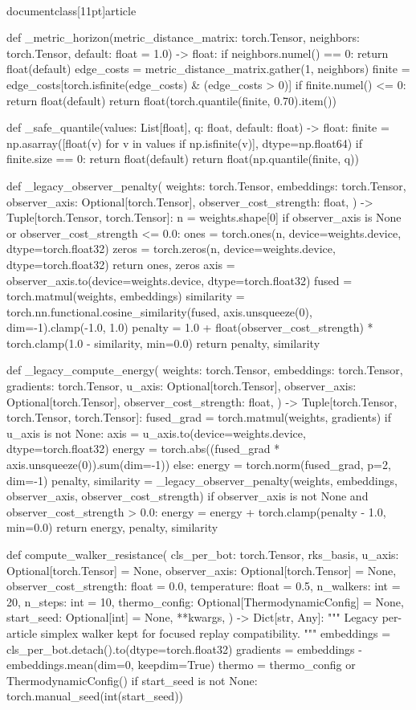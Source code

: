 \\documentclass[11pt]{article}
\begin{document}
\begin{CodeBlock}
def _metric_horizon(metric_distance_matrix: torch.Tensor, neighbors: torch.Tensor, default: float = 1.0) -> float:
    if neighbors.numel() == 0:
        return float(default)
    edge_costs = metric_distance_matrix.gather(1, neighbors)
    finite = edge_costs[torch.isfinite(edge_costs) & (edge_costs > 0)]
    if finite.numel() <= 0:
        return float(default)
    return float(torch.quantile(finite, 0.70).item())


def _safe_quantile(values: List[float], q: float, default: float) -> float:
    finite = np.asarray([float(v) for v in values if np.isfinite(v)], dtype=np.float64)
    if finite.size == 0:
        return float(default)
    return float(np.quantile(finite, q))


def _legacy_observer_penalty(
    weights: torch.Tensor,
    embeddings: torch.Tensor,
    observer_axis: Optional[torch.Tensor],
    observer_cost_strength: float,
) -> Tuple[torch.Tensor, torch.Tensor]:
    n = weights.shape[0]
    if observer_axis is None or observer_cost_strength <= 0.0:
        ones = torch.ones(n, device=weights.device, dtype=torch.float32)
        zeros = torch.zeros(n, device=weights.device, dtype=torch.float32)
        return ones, zeros
    axis = observer_axis.to(device=weights.device, dtype=torch.float32)
    fused = torch.matmul(weights, embeddings)
    similarity = torch.nn.functional.cosine_similarity(fused, axis.unsqueeze(0), dim=-1).clamp(-1.0, 1.0)
    penalty = 1.0 + float(observer_cost_strength) * torch.clamp(1.0 - similarity, min=0.0)
    return penalty, similarity


def _legacy_compute_energy(
    weights: torch.Tensor,
    embeddings: torch.Tensor,
    gradients: torch.Tensor,
    u_axis: Optional[torch.Tensor],
    observer_axis: Optional[torch.Tensor],
    observer_cost_strength: float,
) -> Tuple[torch.Tensor, torch.Tensor, torch.Tensor]:
    fused_grad = torch.matmul(weights, gradients)
    if u_axis is not None:
        axis = u_axis.to(device=weights.device, dtype=torch.float32)
        energy = torch.abs((fused_grad * axis.unsqueeze(0)).sum(dim=-1))
    else:
        energy = torch.norm(fused_grad, p=2, dim=-1)
    penalty, similarity = _legacy_observer_penalty(weights, embeddings, observer_axis, observer_cost_strength)
    if observer_axis is not None and observer_cost_strength > 0.0:
        energy = energy + torch.clamp(penalty - 1.0, min=0.0)
    return energy, penalty, similarity


def compute_walker_resistance(
    cls_per_bot: torch.Tensor,
    rks_basis,
    u_axis: Optional[torch.Tensor] = None,
    observer_axis: Optional[torch.Tensor] = None,
    observer_cost_strength: float = 0.0,
    temperature: float = 0.5,
    n_walkers: int = 20,
    n_steps: int = 10,
    thermo_config: Optional[ThermodynamicConfig] = None,
    start_seed: Optional[int] = None,
    **kwargs,
) -> Dict[str, Any]:
    """
    Legacy per-article simplex walker kept for focused replay compatibility.
    """
    embeddings = cls_per_bot.detach().to(dtype=torch.float32)
    gradients = embeddings - embeddings.mean(dim=0, keepdim=True)
    thermo = thermo_config or ThermodynamicConfig()
    if start_seed is not None:
        torch.manual_seed(int(start_seed))


\end{CodeBlock}
\end{document}
